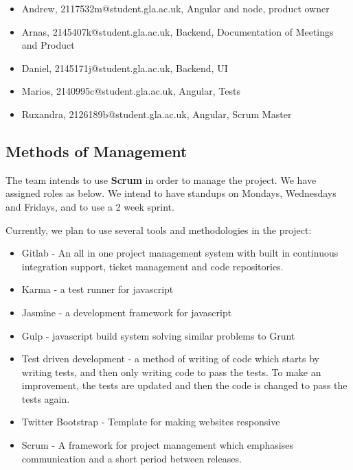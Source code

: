 \documentclass[10pt,a4paper]{article}
\begin{document}
\begin{itemize}

\item
Andrew, 2117532m@student.gla.ac.uk, Angular and node, product owner
\item
Arnas, 2145407k@student.gla.ac.uk, Backend, Documentation of Meetings and Product
\item
Daniel, 2145171j@student.gla.ac.uk, Backend, UI
\item
Marios, 2140995c@student.gla.ac.uk, Angular, Tests
\item
Ruxandra, 2126189b@student.gla.ac.uk, Angular, Scrum Master

\end{itemize}

\subsection{Methods of Management}
The team intends to use \textbf{Scrum} in order to manage the project. We have assigned roles as below. We intend to have standups on Mondays, Wednesdays and Fridays, and to use a 2 week sprint.



Currently, we plan to use several tools and methodologies in the project:
\begin{itemize}

\item
Gitlab - An all in one project management system with built in continuous integration support, ticket management and code repositories. 

\item 
Karma - a test runner for javascript

\item
Jasmine - a development framework for javascript

\item
Gulp - javascript build system solving similar problems to Grunt

\item
Test driven development - a method of writing of code which starts by writing tests, and then only writing code to pass the tests. To make an improvement, the tests are updated and then the code is changed to pass the tests again.

\item
Twitter Bootstrap - Template for making websites responsive

\item
Scrum - A framework for project management which emphasises communication and a short period between releases.

\end{itemize}
\end{document}
